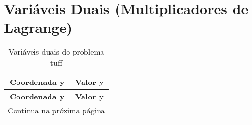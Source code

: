 \documentclass[12pt]{article}
\begin{document}
\section{Variáveis Duais (Multiplicadores de Lagrange)}

\begin{longtable}{@{}cc@{}}
\caption{Variáveis duais do problema tuff} \\
\toprule
\textbf{Coordenada y} & \textbf{Valor y} \\
\midrule
\endfirsthead

\toprule
\textbf{Coordenada y} & \textbf{Valor y} \\
\midrule
\endhead

\midrule \multicolumn{2}{r}{{Continua na próxima página}} \\ \midrule
\endfoot


\end{longtable}
\end{document}
